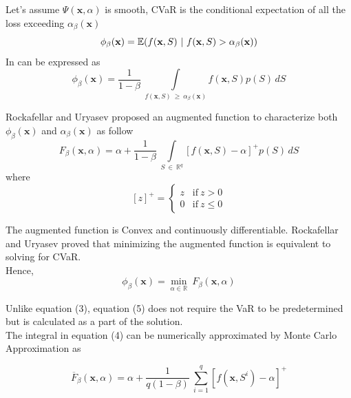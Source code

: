 \documentclass[conference]{IEEEtran}
\begin{document}
    Let's assume $ \Psi(\textbf{x}, \alpha) $ is smooth, CVaR is the conditional expectation of all the loss exceeding $\alpha_\beta(\textbf{x})$
    \begin{equation}
        \phi_\beta(\textbf{x}) = \mathbb{E}
        (f(\textbf{x}, S) \ | \ f(\textbf{x}, S) >  \alpha_\beta(\textbf{x}))
        \notag
    \end{equation}
    In can be expressed as
    \begin{equation}
        \phi_\beta(\textbf{x}) = 
        \frac{1}{1 - \beta} \
        \underset{f(\textbf{x}, S) \ \geq \ 
        \alpha_\beta(\textbf{x})} {\int}
        f(\textbf{x}, S) p(S) \, dS
    \end{equation}
    
    Rockafellar and Uryasev proposed an augmented function to characterize both 
    $\phi_\beta(\textbf{x})$ and 
    $\alpha_\beta(\textbf{x})$ as follow
    \begin{equation}
        F_\beta(\textbf{x}, \alpha) = 
        \alpha + \frac{1}{1 - \beta} \
        \underset{S \ \in \ \mathbb{R}^q} {\int}
        [f(\textbf{x}, S) - \alpha]^+ p(S) \, dS
    \end{equation}
    where 
    \[
        [z]^+ = 
        \begin{cases}
            z & \text{if} \ z > 0 \\
            0 & \text{if} \ z \leq 0
        \end{cases}
    \]
    
    The augmented function is Convex and continuously differentiable. Rockafellar and Uryasev proved that minimizing the augmented function is equivalent to solving for CVaR. \\ 
    
    Hence, 
    \begin{equation}
        \phi_\beta(\textbf{x}) = 
        \underset{\alpha \in \mathbb{R}} {\min}
        \ F_\beta(\textbf{x}, \alpha)
    \end{equation}
    
    Unlike equation (3), equation (5) does not require the VaR to be predetermined but is calculated as a part of the solution. \\
    
    The integral in equation (4) can be numerically approximated by Monte Carlo Approximation as
    
    \begin{equation}
        \overline{F}_\beta(\textbf{x}, \alpha) =
        \alpha + \frac{1}{q(1-\beta)} \ 
        \sum_{i=1}^q [f(\textbf{x}, S^i) - \alpha]^+
    \end{equation}
\end{document}
